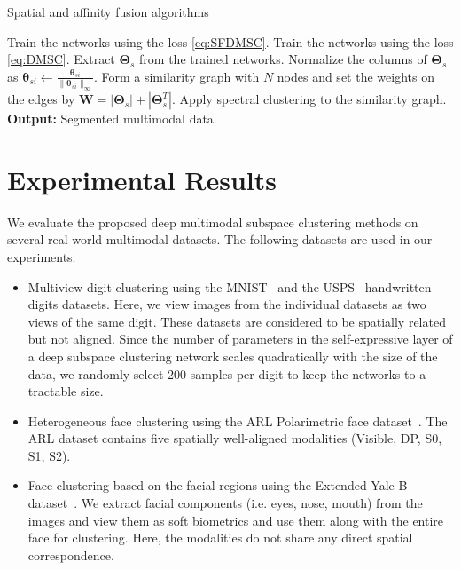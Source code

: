 \documentclass[journal]{IEEEtran}
\begin{document}
\begin{algorithm}[t]
\caption{Spatial and affinity fusion algorithms}\label{alg:DMSC}
\begin{algorithmic}[1]
\State Train the networks using the loss \eqref{eq:SFDMSC}.
\State Train the networks using the loss \eqref{eq:DMSC}.
\EndIf
\State Extract $\boldsymbol{\Theta}_{s}$ from the trained networks.
 \State Normalize the columns of $\boldsymbol{\Theta}_{s}$ as $\boldsymbol{\theta}_{si}\leftarrow \frac{\boldsymbol{\theta}_{si}}{\|\boldsymbol{\theta}_{si}\|_{\infty}}$.
\State Form a similarity graph with $N$ nodes and set the weights on the edges by $\mathbf{W}=|\boldsymbol{\Theta}_{s}|+|\boldsymbol{\Theta}_{s}^{T}|$.
\State Apply spectral clustering to the similarity graph.
\EndProcedure
\State \textbf{Output:} Segmented multimodal data.
 \end{algorithmic}
\end{algorithm}



       
\section{Experimental Results}
\label{sec:exper}
We evaluate the proposed deep multimodal subspace clustering methods on several real-world multimodal datasets. The following datasets are used in our experiments.  
\begin{itemize}
	\item Multiview digit clustering using the  MNIST~\cite{lecun2010mnist} and the USPS~\cite{hull1994database} handwritten digits datasets.  Here, we view images from the individual datasets as two views of the same digit.	 These datasets are considered to be spatially related but not aligned. Since the number of parameters in the self-expressive layer of a deep subspace clustering network scales quadratically with the size of the data, we randomly select 200 samples per digit to keep the networks to a tractable size. 
	\item Heterogeneous face clustering using the ARL Polarimetric face dataset~\cite{hu2016polarimetric}.  The ARL dataset contains five spatially well-aligned modalities (Visible, DP, S0, S1, S2).  
	\item Face clustering based on the facial regions using the  Extended Yale-B dataset~\cite{9ptsLight}.  We extract facial components (i.e. eyes, nose, mouth) from the images and view them as soft biometrics and use them along with the entire face for clustering.  Here, the modalities do not share any direct  spatial correspondence.
	\end{itemize}
		   
\end{document}
